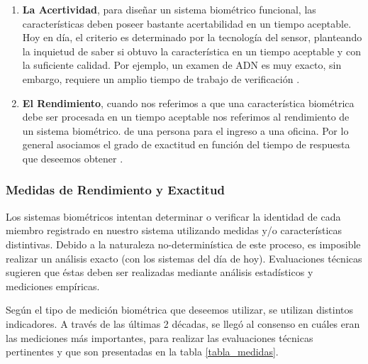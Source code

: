 \begin{enumerate}
\item \textbf{La Acertividad}, para diseñar un sistema biométrico funcional, las características deben poseer bastante acertabilidad en un tiempo aceptable. Hoy en día, el criterio es determinado por la tecnología del sensor, planteando la inquietud de saber si obtuvo la característica en un tiempo aceptable y con la suficiente calidad. Por ejemplo, un examen de ADN es muy exacto, sin embargo, requiere un amplio tiempo de trabajo de verificación \cite{Zha00}.


\item \textbf{El Rendimiento}, cuando nos referimos a que una característica biométrica debe ser procesada en un tiempo aceptable nos referimos al rendimiento de un sistema biométrico.  de una persona para el ingreso a una oficina. Por lo general asociamos el grado de exactitud en función del tiempo de respuesta que deseemos obtener \cite{Way00}.

\end{enumerate}


\subsubsection{Medidas de Rendimiento y Exactitud}

Los sistemas biométricos intentan determinar o verificar la identidad de cada miembro registrado en nuestro sistema utilizando medidas y/o características distintivas. Debido a la naturaleza no-determinística de este proceso, es imposible realizar un análisis exacto (con los sistemas del día de hoy). Evaluaciones técnicas sugieren que éstas deben ser realizadas mediante análisis estadísticos y mediciones empíricas.

Según el tipo de medición biométrica que deseemos utilizar, se utilizan distintos indicadores. A través de las últimas 2 décadas, se llegó al consenso en cuáles eran las mediciones más importantes, para realizar las evaluaciones técnicas pertinentes \cite{Way99} y que son presentadas en la tabla \ref{tabla_medidas}.



